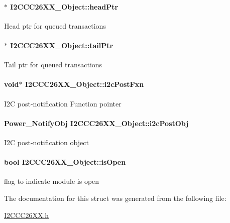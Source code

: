 \paragraph[{head\-Ptr}]{$\ast$ I2\-C\-C\-C26\-X\-X\-\_\-\-Object\-::head\-Ptr}\label{struct_i2_c_c_c26_x_x___object_a7148eed6e39ab2ab626c53030c7b77bb}
Head ptr for queued transactions 
\paragraph[{tail\-Ptr}]{$\ast$ I2\-C\-C\-C26\-X\-X\-\_\-\-Object\-::tail\-Ptr}\label{struct_i2_c_c_c26_x_x___object_a6cd1216ab6faa1e951186dfe696f841b}
Tail ptr for queued transactions 
\paragraph[{i2c\-Post\-Fxn}]{\setlength{\rightskip}{0pt plus 5cm}void$\ast$ I2\-C\-C\-C26\-X\-X\-\_\-\-Object\-::i2c\-Post\-Fxn}\label{struct_i2_c_c_c26_x_x___object_a6a7aaccb2b2b05d9fd9230924acf9e96}
I2\-C post-\/notification Function pointer 
\paragraph[{i2c\-Post\-Obj}]{\setlength{\rightskip}{0pt plus 5cm}Power\-\_\-\-Notify\-Obj I2\-C\-C\-C26\-X\-X\-\_\-\-Object\-::i2c\-Post\-Obj}\label{struct_i2_c_c_c26_x_x___object_a2b16c813ec8f21896de5eecf03ed4178}
I2\-C post-\/notification object 
\paragraph[{is\-Open}]{\setlength{\rightskip}{0pt plus 5cm}bool I2\-C\-C\-C26\-X\-X\-\_\-\-Object\-::is\-Open}\label{struct_i2_c_c_c26_x_x___object_a4c74297d4652d9f61558ca4099867686}
flag to indicate module is open 

The documentation for this struct was generated from the following file\-:\begin{DoxyCompactItemize}
\item 
\hyperlink{_i2_c_c_c26_x_x_8h}{I2\-C\-C\-C26\-X\-X.\-h}\end{DoxyCompactItemize}
